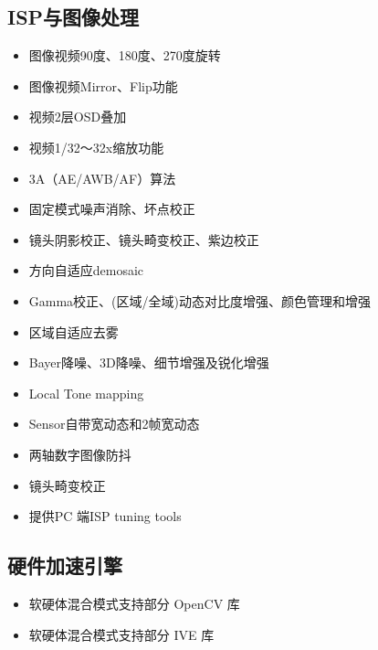 \documentclass[letterpaper,10pt,english]{sphinxmanual}
\begin{document}
\subsection{ISP与图像处理}
\label{\detokenize{contents/system-overview/features:isp}}\begin{itemize}
\item {} 
\sphinxAtStartPar
图像视频90度、180度、270度旋转

\item {} 
\sphinxAtStartPar
图像视频Mirror、Flip功能

\item {} 
\sphinxAtStartPar
视频2层OSD叠加

\item {} 
\sphinxAtStartPar
视频1/32～32x缩放功能

\item {} 
\sphinxAtStartPar
3A（AE/AWB/AF）算法

\item {} 
\sphinxAtStartPar
固定模式噪声消除、坏点校正

\item {} 
\sphinxAtStartPar
镜头阴影校正、镜头畸变校正、紫边校正

\item {} 
\sphinxAtStartPar
方向自适应demosaic

\item {} 
\sphinxAtStartPar
Gamma校正、(区域/全域)动态对比度增强、颜色管理和增强

\item {} 
\sphinxAtStartPar
区域自适应去雾

\item {} 
\sphinxAtStartPar
Bayer降噪、3D降噪、细节增强及锐化增强

\item {} 
\sphinxAtStartPar
Local Tone mapping

\item {} 
\sphinxAtStartPar
Sensor自带宽动态和2帧宽动态

\item {} 
\sphinxAtStartPar
两轴数字图像防抖

\item {} 
\sphinxAtStartPar
镜头畸变校正

\item {} 
\sphinxAtStartPar
提供PC 端ISP tuning tools

\end{itemize}


\subsection{硬件加速引擎}
\label{\detokenize{contents/system-overview/features:id5}}\begin{itemize}
\item {} 
\sphinxAtStartPar
软硬体混合模式支持部分 OpenCV 库

\item {} 
\sphinxAtStartPar
软硬体混合模式支持部分 IVE 库

\end{itemize}
\end{document}
